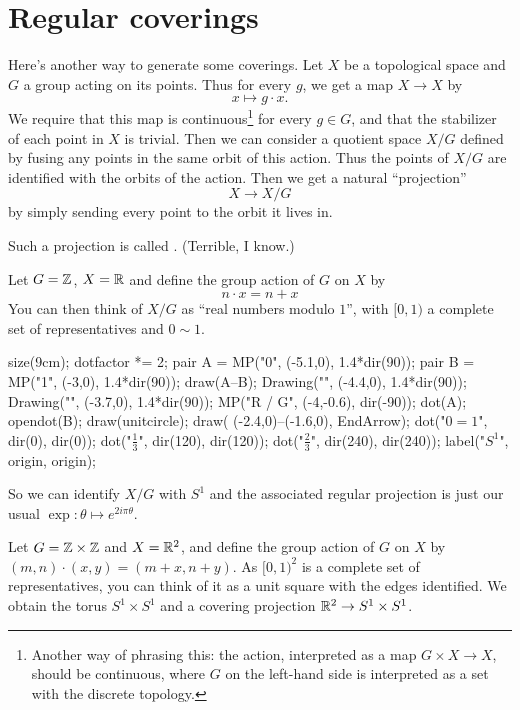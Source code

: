 \section{Regular coverings}

Here's another way to generate some coverings.
Let $X$ be a topological space and $G$ a group acting on its points.
Thus for every $g$, we get a map $X \to X$ by
\[ x \mapsto g \cdot x. \]
We require that this map is continuous\footnote{%
	Another way of phrasing this: the action,
	interpreted as a map $G \times X \to X$, should be continuous,
	where $G$ on the left-hand side is interpreted as a set with
	the discrete topology.}
for every $g \in G$, and that the stabilizer of each point in $X$ is trivial.
Then we can consider a quotient space $X/G$ defined by fusing any points
in the same orbit of this action.
Thus the points of $X/G$ are identified with the orbits of the action.
Then we get a natural ``projection''
\[ X \to X/G \]
by simply sending every point to the orbit it lives in.
\begin{definition}
	Such a projection is called .
	(Terrible, I know.)
\end{definition}

\begin{example}[$\RR \to S^1$ is regular]
	Let $G = \mathbb Z$, $X = \mathbb R$
	and define the group action of $G$ on $X$ by
	\[ n \cdot x = n + x \]
	You can then think of $X/G$ as ``real numbers modulo $1$'',
	with $[0,1)$ a complete set of representatives and $0 \sim 1$. %
	\begin{center}
		\begin{asy}
			size(9cm);
			dotfactor *= 2;
			pair A = MP("0", (-5.1,0), 1.4*dir(90));
			pair B = MP("1", (-3,0), 1.4*dir(90));
			draw(A--B);
			Drawing("", (-4.4,0), 1.4*dir(90));
			Drawing("", (-3.7,0), 1.4*dir(90));
			MP("\mathbb R / G", (-4,-0.6), dir(-90));
			dot(A); opendot(B);
			draw(unitcircle);
			draw( (-2.4,0)--(-1.6,0), EndArrow);
			dot("$0=1$", dir(0), dir(0));
			dot("$\frac13$", dir(120), dir(120));
			dot("$\frac23$", dir(240), dir(240));
			label("$S^1$", origin, origin);
		\end{asy}
	\end{center}
	So we can identify $X/G$ with $S^1$
	and the associated regular projection
	is just our usual $\exp \colon \theta \mapsto e^{2i\pi \theta}$.
\end{example}

\begin{example}
	Let $G = \mathbb Z \times \mathbb Z$ and $X = \mathbb R^2$,
	and define the group action of $G$ on $X$ by $(m,n) \cdot (x,y)
	= (m+x, n+y)$.
	As $[0,1)^2$ is a complete set of representatives, %
	you can think of it as a unit square with the edges identified.
	We obtain the torus $S^1 \times S^1$
	and a covering projection $\mathbb R^2 \to S^1 \times S^1$.
\end{example}

